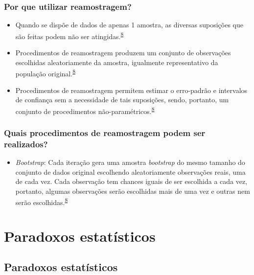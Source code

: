 \documentclass[
  a4paper,
]{book}
\providecommand{\tightlist}{%
  \setlength{\itemsep}{0pt}\setlength{\parskip}{0pt}}
\begin{document}
\hypertarget{por-que-utilizar-reamostragem}{%
\subsection{Por que utilizar reamostragem?}\label{por-que-utilizar-reamostragem}}

\begin{itemize}
\item
  Quando se dispõe de dados de apenas 1 amostra, as diversas suposições que são feitas podem não ser atingidas.\textsuperscript{\protect\hyperlink{ref-Bland2015}{8}}
\item
  Procedimentos de reamostragem produzem um conjunto de observações escolhidas aleatoriamente da amostra, igualmente representativo da população original.\textsuperscript{\protect\hyperlink{ref-Bland2015}{8}}
\item
  Procedimentos de reamostragem permitem estimar o erro-padrão e intervalos de confiança sem a necessidade de tais suposições, sendo, portanto, um conjunto de procedimentos não-paramétricos.\textsuperscript{\protect\hyperlink{ref-Bland2015}{8}}
\end{itemize}

\hypertarget{quais-procedimentos-de-reamostragem-podem-ser-realizados}{%
\subsection{Quais procedimentos de reamostragem podem ser realizados?}\label{quais-procedimentos-de-reamostragem-podem-ser-realizados}}

\begin{itemize}
\tightlist
\item
  \emph{Bootstrap}: Cada iteração gera uma amostra \emph{bootstrap} do mesmo tamanho do conjunto de dados original escolhendo aleatoriamente observações reais, uma de cada vez. Cada observação tem chances iguais de ser escolhida a cada vez, portanto, algumas observações serão escolhidas mais de uma vez e outras nem serão escolhidas.\textsuperscript{\protect\hyperlink{ref-Bland2015}{8}}
\end{itemize}

\hypertarget{paradoxos-estatisticos}{%
\chapter{\texorpdfstring{\textbf{Paradoxos estatísticos}}{Paradoxos estatísticos}}\label{paradoxos-estatisticos}}

\hypertarget{paradoxos}{%
\section{Paradoxos estatísticos}\label{paradoxos}}
\end{document}
